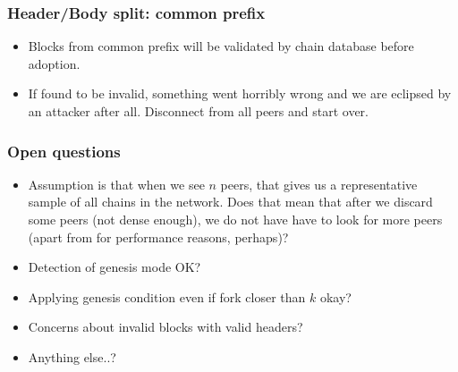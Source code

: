 \documentclass[usenames,dvipsnames,t]{beamer}
\begin{document}
\begin{frame}

\frametitle{Header/Body split: common prefix}

\begin{center}
\end{center}

\begin{itemize}
\item Blocks from common prefix will be validated by chain database before adoption.
\item If found to be invalid, something went horribly wrong and we are eclipsed by
an attacker after all. Disconnect from all peers and start over.
\end{itemize}

\end{frame}


\begin{frame}

\frametitle{Open questions}

\begin{itemize}
\item Assumption is that when we see $n$ peers, that gives us a representative sample of all chains in the network. Does that mean that after we discard some peers (not dense enough), we do not have have to look for more peers (apart from for performance reasons, perhaps)?
\item Detection of genesis mode OK?
\item Applying genesis condition even if fork closer than $k$ okay?
\item Concerns about invalid blocks with valid headers?
\item Anything else..?
\end{itemize}

\end{frame}
\end{document}
